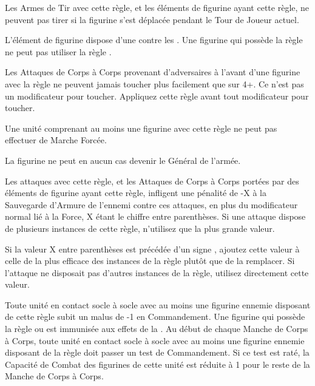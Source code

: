 
Les Armes de Tir avec cette règle, et les éléments de figurine ayant cette règle, ne peuvent pas tirer si la figurine s'est déplacée pendant le Tour de Joueur actuel.


L'élément de figurine dispose d'une  contre les \flamingattacks{}. Une figurine qui possède la règle \fireborn{} ne peut pas utiliser la règle \regeneration{}.


Les Attaques de Corps à Corps provenant d'adversaires à l'avant d'une figurine avec la règle \parry{} ne peuvent jamais toucher plus facilement que sur 4+. Ce n'est pas un modificateur pour toucher. Appliquez cette règle avant tout modificateur pour toucher.


Une unité comprenant au moins une figurine avec cette règle ne peut pas effectuer de Marche Forcée.


La figurine ne peut en aucun cas devenir le Général de l'armée.


Les attaques avec cette règle, et les Attaques de Corps à Corps portées par des éléments de figurine ayant cette règle, infligent une pénalité de -X à la Sauvegarde d'Armure de l'ennemi contre ces attaques, en plus du modificateur normal lié à la Force, X étant le chiffre entre parenthèses. Si une attaque dispose de plusieurs instances de cette règle, n'utilisez que la plus grande valeur.

Si la valeur X entre parenthèses est précédée d'un signe \result{+}, ajoutez cette valeur à celle de la plus efficace des instances de la règle \armourpiercing{} plutôt que de la remplacer. Si l'attaque ne disposait pas d'autres instances de la règle, utilisez directement cette valeur.


Toute unité en contact socle à socle avec au moins une figurine ennemie disposant de cette règle subit un malus de -1 en Commandement. Une figurine qui possède la règle \immunetopsychology{} ou \fear{} est immunisée aux effets de la \fear{}. Au début de chaque Manche de Corps à Corps, toute unité en contact socle à socle avec au moins une figurine ennemie disposant de la règle \fear{} doit passer un test de Commandement. Si ce test est raté, la Capacité de Combat des figurines de cette unité est réduite à 1 pour le reste de la Manche de Corps à Corps.

